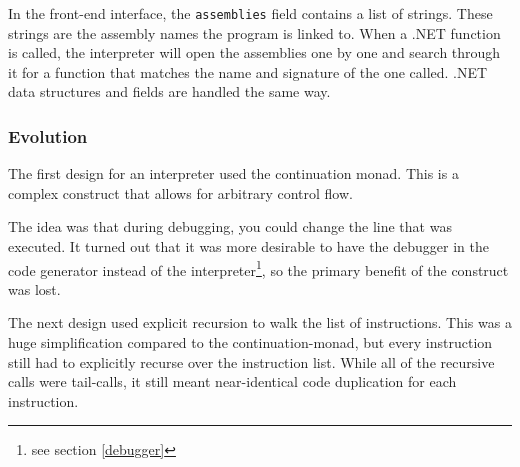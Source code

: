 In the front-end interface, the \verb|assemblies| field contains a list of strings.
These strings are the assembly names the program is linked to.
When a .NET function is called, the interpreter will open the assemblies one by one and search through it for a function that matches the name and signature of the one called.
.NET data structures and fields are handled the same way.

\subsubsection{Evolution}
The first design for an interpreter used the continuation monad.
This is a complex construct that allows for arbitrary control flow.

The idea was that during debugging, you could change the line that was executed.
It turned out that it was more desirable to have the debugger in the code generator instead of the interpreter\footnote{see section \ref{debugger}}, so the primary benefit of the construct was lost.

The next design used explicit recursion to walk the list of instructions.
This was a huge simplification compared to the continuation-monad, but every instruction still had to explicitly recurse over the instruction list.
While all of the recursive calls were tail-calls\cite{tailcalls}, it still meant near-identical code duplication for each instruction.


